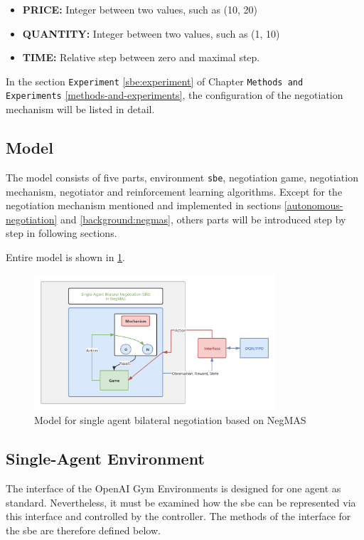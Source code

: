 \begin{itemize}
	\item \textbf{PRICE:} Integer between two values, such as (10, 20)
	\item \textbf{QUANTITY:} Integer between two values, such as (1, 10)
	\item \textbf{TIME:} Relative step between zero and maximal step.
\end{itemize}


In the section \texttt{Experiment} \ref{sbe:experiment} of Chapter \texttt{Methods and Experiments} \ref{methods-and-experiments}, the configuration of the negotiation mechanism will be listed in detail.
 
\subsection{Model}
The model consists of five parts, environment \texttt{\gls{sbe}}, negotiation game, negotiation mechanism, negotiator and reinforcement learning algorithms.
Except for the negotiation mechanism mentioned and implemented in sections \ref{autonomous-negotiation} and \ref{background:negmas}, others parts will be introduced step by step in following sections. 

Entire model is shown in \ref{fig:environment-single-agent}.
\begin{figure}[htbp]
\centering
\includegraphics[width=0.80\textwidth]{./images/sbe.png}
\caption{Model for single agent bilateral negotiation based on NegMAS}
\label{fig:environment-single-agent}
\end{figure}

\subsection{Single-Agent Environment} \label{single-agent-env}
The interface of the OpenAI Gym Environments is designed for one agent as standard. Nevertheless, it must be examined how the \gls{sbe} can be represented via this interface and controlled by the controller. The methods of the interface for the \gls{sbe} are therefore defined below. 

